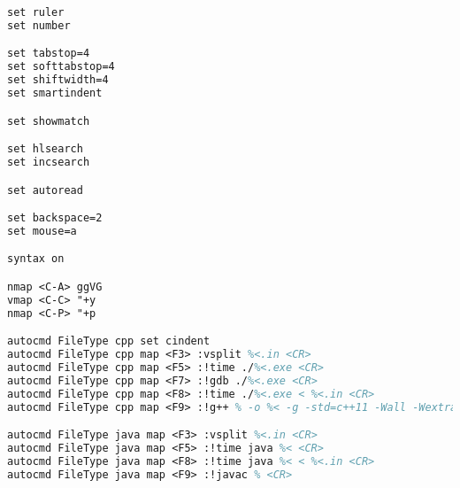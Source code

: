 \begin{lstlisting}[language=tex,identifierstyle=\color{black},commentstyle=\color{black}]
set ruler
set number

set tabstop=4
set softtabstop=4
set shiftwidth=4
set smartindent

set showmatch

set hlsearch
set incsearch

set autoread

set backspace=2
set mouse=a

syntax on

nmap <C-A> ggVG
vmap <C-C> "+y
nmap <C-P> "+p

autocmd FileType cpp set cindent
autocmd FileType cpp map <F3> :vsplit %<.in <CR>
autocmd FileType cpp map <F5> :!time ./%<.exe <CR>
autocmd FileType cpp map <F7> :!gdb ./%<.exe <CR>
autocmd FileType cpp map <F8> :!time ./%<.exe < %<.in <CR>
autocmd FileType cpp map <F9> :!g++ % -o %< -g -std=c++11 -Wall -Wextra -Wconversion && size %<.exe <CR>

autocmd FileType java map <F3> :vsplit %<.in <CR>
autocmd FileType java map <F5> :!time java %< <CR>
autocmd FileType java map <F8> :!time java %< < %<.in <CR>
autocmd FileType java map <F9> :!javac % <CR>
\end{lstlisting}

